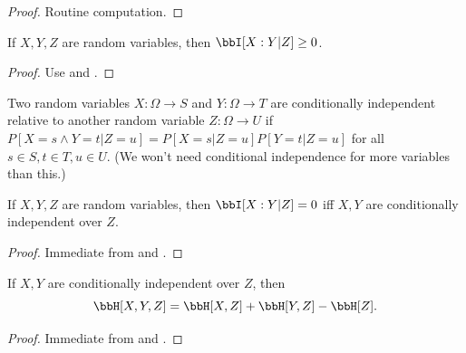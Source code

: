 \begin{proof}\leanok Routine computation.
\end{proof}

\begin{lemma}
\label{conditional-nonneg}
\leanok
If $X,Y,Z$ are random variables, then $\bbI[X:Y|Z] \ge 0$.
\end{lemma}
\begin{proof}
\leanok
Use  and .
\end{proof}

\begin{definition}
\label{conditional-independent-def}
\leanok
  Two random variables $X: \Omega \to S$ and $Y: \Omega \to T$ are conditionally independent relative to another random variable $Z: \Omega \to U$ if $P[X = s \wedge Y = t| Z=u] = P[X=s|Z=u] P[Y=t|Z=u]$ for all $s \in S, t \in T, u \in U$.  (We won't need conditional independence for more variables than this.)
\end{definition}

\begin{lemma}\label{conditional-vanish}
  \leanok
  If $X,Y,Z$ are random variables, then $\bbI[X:Y|Z] = 0$ iff $X,Y$ are conditionally independent over $Z$.
\end{lemma}

\begin{proof} \leanok Immediate from  and .
\end{proof}

\begin{corollary}\label{cond-trial-ent}
  \leanok
  If $X, Y$ are conditionally independent over $Z$, then
  $$ \bbH[X,Y,Z] =\bbH[X,Z] + \bbH[Y,Z] - \bbH[Z].$$
\end{corollary}

\begin{proof}\leanok Immediate from  and .
\end{proof}
